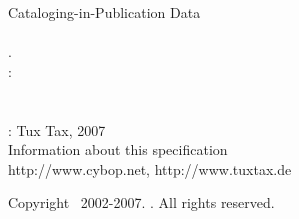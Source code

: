 %
%
%
%
%
%

\small{Cataloging-in-Publication Data\\\\
    \authormacro.\\
    \titlemacro:\\
    \subtitlemacro\\
    \versionmacro\\
    \placemacro: Tux Tax, 2007%
}\\

\small{Information about this specification\\
    http://www.cybop.net, http://www.tuxtax.de}

\vspace{4cm}

\small{Copyright \textcopyright\ 2002-2007. \authormacro. All rights reserved.}

